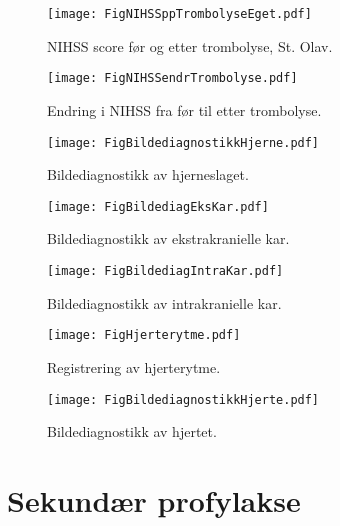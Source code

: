 \documentclass [norsk,a4paper,twoside]{article}\usepackage[]{graphicx}\usepackage[]{color}
\begin{document}
\begin{figure}[ht]
\centering \texttt{[image: FigNIHSSppTrombolyseEget.pdf]}
\caption{\label{fig:NIHSSendrTrombolyse} NIHSS score før og etter trombolyse, St. Olav.}
\end{figure}

\begin{figure}[ht]
\centering \texttt{[image: FigNIHSSendrTrombolyse.pdf]}
\caption{\label{fig:NIHSSendrTrombolyse} Endring i NIHSS fra før til etter trombolyse.}
\end{figure}

\begin{figure}[ht]
\centering \texttt{[image: FigBildediagnostikkHjerne.pdf]}
\caption{\label{fig:BildediagnostikkHjerne} Bildediagnostikk av hjerneslaget.}
\end{figure}

\begin{figure}[ht]
\centering \texttt{[image: FigBildediagEksKar.pdf]}
\caption{\label{fig:BildediagEksKar} Bildediagnostikk av ekstrakranielle kar.}
\end{figure}

\begin{figure}[ht]
\centering \texttt{[image: FigBildediagIntraKar.pdf]}
\caption{\label{fig:BildediagIntraKar} Bildediagnostikk av intrakranielle kar.}
\end{figure}

\begin{figure}[ht]
\centering \texttt{[image: FigHjerterytme.pdf]}
\caption{\label{fig:Hjerterytme} Registrering av hjerterytme.}
\end{figure}

\begin{figure}[ht]
\centering \texttt{[image: FigBildediagnostikkHjerte.pdf]}
\caption{\label{fig:BildediagnostikkHjerte} Bildediagnostikk av hjertet.}
\end{figure}


\clearpage
	

	
\section{Sekundær profylakse}
	
\end{document}
